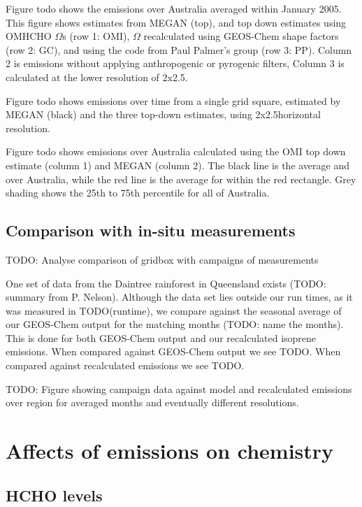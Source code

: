     Figure todo shows the emissions over Australia averaged within January 2005.
    This figure shows estimates from MEGAN (top), and top down estimates using OMHCHO $\Omega$s (row 1: OMI), $\Omega$ recalculated using GEOS-Chem shape factors (row 2: GC), and using the code from Paul Palmer's group (row 3: PP).
    Column 2 is emissions without applying anthropogenic or pyrogenic filters, Column 3 is calculated at the lower resolution of 2x2.5\degr.
    
    Figure todo shows emissions over time from a single grid square, estimated by MEGAN (black) and the three top-down estimates, using 2x2.5\degr horizontal resolution.
    
    Figure todo shows emissions over Australia calculated using the OMI top down estimate (column 1) and MEGAN (column 2). 
    The black line is the average and over Australia, while the red line is the average for within the red rectangle. 
    Grey shading shows the 25th to 75th percentile for all of Australia.
    
  \subsection{Comparison with in-situ measurements}
    
    TODO: %
    Analyse comparison of gridbox with campaigns of measurements
    
    One set of data from the Daintree rainforest in Queensland exists (TODO: summary from P. Nelson).
    Although the data set lies outside our run times, as it was measured in TODO(runtime), we compare against the seasonal average of our GEOS-Chem output for the matching months (TODO: name the months).
    This is done for both GEOS-Chem output and our recalculated isoprene emissions.
    When compared against GEOS-Chem output we see TODO.
    When compared against recalculated emissions we see TODO.
    
    TODO: Figure showing campaign data against model and recalculated emissions over region for averaged months and eventually different resolutions.

 \section{Affects of emissions on chemistry}
 
   \subsection{HCHO levels}
     
